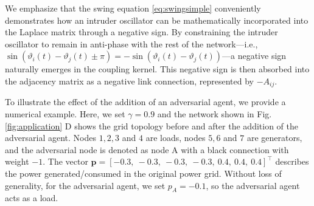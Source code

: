 \documentclass[%
 reprint,
 amsmath,amssymb,
 aip,
]{revtex4-2}
\def \bp {\pmb{p}}
\theoremstyle{italichead}
\theoremstyle{definition}
\begin{document}
{{We emphasize that the swing equation \eqref{eq:swingsimple} conveniently demonstrates how an intruder oscillator can be mathematically incorporated into the Laplace matrix through a negative sign. By constraining the intruder oscillator to remain in anti-phase with the rest of the network—i.e., \(\sin(\vartheta_i(t) - \vartheta_j(t) \pm \pi) = -\sin(\vartheta_i(t) - \vartheta_j(t))\)—a negative sign naturally emerges in the coupling kernel. This negative sign is then absorbed into the adjacency matrix as a negative link connection, represented by \(-A_{ij}\).} 

To illustrate the effect of the addition of an adversarial agent, we provide a numerical example. 
Here, we set %
$\gamma = 0.9$ and the network shown in Fig.\,\ref{fig:application} D shows the grid topology before and after the addition of the adversarial agent. 
Nodes $1,2,3$ and $4$ are loads, nodes $5,6$ and $7$ are generators, and the adversarial node is denoted as node A with a black connection with weight $-1$.
The vector $\bp = [
-0.3, \ -0.3, \ -0.3, \ -0.3, \ 0.4, \ 0.4, \ 0.4 
]^\top$ describes the power generated/consumed in the original power grid.
Without loss of generality, for the adversarial agent, we set $p_{A} = -0.1$, so the adversarial agent acts as a load.


}
\end{document}
